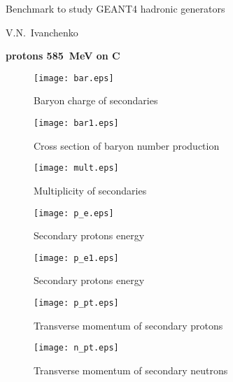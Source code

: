 \documentclass[12pt]{article}
\begin{document}
\pagestyle{empty}

\begin{center}
{\large Benchmark to study GEANT4 hadronic generators} 

\vspace*{5mm}
V.N.~Ivanchenko

\vspace*{5mm}


\vspace*{5mm}

{\bf protons 585~MeV on C} 

\vspace*{5mm}


\end{center}


\begin{figure}[htbp]
\caption{Baryon charge of secondaries}
\label{fig1}  
\centerline{\texttt{[image: bar.eps]}}
\end{figure}

\begin{figure}[htbp]
\caption{Cross section of baryon number production}
\label{fig1b}  
\centerline{\texttt{[image: bar1.eps]}}
\end{figure}


\begin{figure}[htbp]
\caption{Multiplicity of secondaries}
\label{fig1a}  
\centerline{\texttt{[image: mult.eps]}}
\end{figure}
\begin{figure}[htbp]
\caption{Secondary protons energy}
\label{fig2} 
\centerline{\texttt{[image: p\_e.eps]}}
\end{figure}
\begin{figure}[htbp]
\caption{Secondary protons energy}
\label{fig2a} 
\centerline{\texttt{[image: p\_e1.eps]}}
\end{figure}

\newpage

\begin{figure}[htbp]
\caption{Transverse momentum of secondary protons} 
\label{fig3}
\centerline{\texttt{[image: p\_pt.eps]}}
\end{figure}

\newpage

\begin{figure}[htbp]
\caption{Transverse momentum of secondary neutrons} 
\label{fig4}
\centerline{\texttt{[image: n\_pt.eps]}}
\end{figure}
\end{document}
